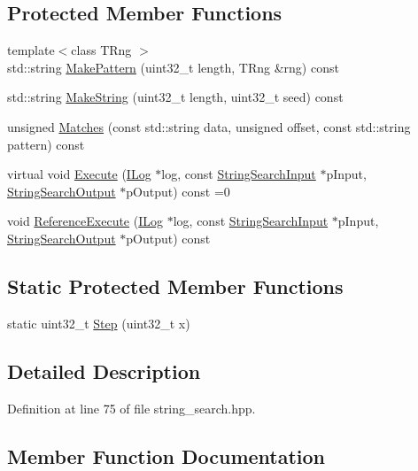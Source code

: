 \subsection*{Protected Member Functions}
\begin{DoxyCompactItemize}
\item 
{\footnotesize template$<$class T\+Rng $>$ }\\std\+::string \hyperlink{a00035_ae2b6bd3807ee6b477d4c7081776ae6f0}{Make\+Pattern} (uint32\+\_\+t length, T\+Rng \&rng) const 
\item 
std\+::string \hyperlink{a00035_a703ceaa5a1e394430bee287784c50dc1}{Make\+String} (uint32\+\_\+t length, uint32\+\_\+t seed) const 
\item 
unsigned \hyperlink{a00035_aa22ba17ebe9bf921e4b0466fc883956e}{Matches} (const std\+::string data, unsigned offset, const std\+::string pattern) const 
\item 
virtual void \hyperlink{a00035_ab38b7057ea7926711c423f6c72d2a49e}{Execute} (\hyperlink{a00008}{I\+Log} $\ast$log, const \hyperlink{a00032}{String\+Search\+Input} $\ast$p\+Input, \hyperlink{a00033}{String\+Search\+Output} $\ast$p\+Output) const =0
\item 
void \hyperlink{a00035_a9c15a95de90157e2c3e98fd6dc482c80}{Reference\+Execute} (\hyperlink{a00008}{I\+Log} $\ast$log, const \hyperlink{a00032}{String\+Search\+Input} $\ast$p\+Input, \hyperlink{a00033}{String\+Search\+Output} $\ast$p\+Output) const 
\end{DoxyCompactItemize}
\subsection*{Static Protected Member Functions}
\begin{DoxyCompactItemize}
\item 
static uint32\+\_\+t \hyperlink{a00035_a045c52e7ce3af5387cb29bd9017fb293}{Step} (uint32\+\_\+t x)
\end{DoxyCompactItemize}


\subsection{Detailed Description}


Definition at line 75 of file string\+\_\+search.\+hpp.



\subsection{Member Function Documentation}
\hypertarget{a00035_a9ca775a43c427b61a6d0c8f365334596}{}
